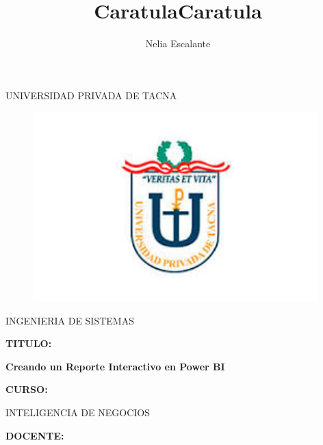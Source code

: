 \documentclass[12pt,letterpaper]{article}
\author{Nelia Escalante}
\title{Caratula}
\begin{document}
\title{Caratula}

\begin{titlepage}
\begin{center}
\large{UNIVERSIDAD PRIVADA DE TACNA}\\
\vspace*{-0.025in}
\begin{figure}[htb]
\begin{center}
\includegraphics[width=11cm]{./IMG/logo}
\end{center}
\end{figure}
\Large INGENIERIA DE SISTEMAS  \\

\vspace*{0.5in}
\begin{large}
\textbf{TITULO:} \\
\end{large}

\vspace*{0.1in}
\begin{Large}
\textbf{Creando un Reporte Interactivo en Power BI} \\
\end{Large}

\vspace*{0.3in}
\begin{Large}
\textbf{CURSO:} \\
\end{Large}

\vspace*{0.1in}
\begin{large}
INTELIGENCIA DE NEGOCIOS\\
\end{large}

\vspace*{0.3in}
\begin{Large}
\textbf{DOCENTE:} \\
\end{Large}


\end{center}
\end{titlepage}
\end{document}

